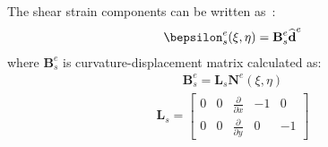 \documentclass[a4paper,12pt]{article}
\begin{document}
The shear strain components can be written as~\cite{ferreira2008matlab}:
\begin{eqnarray}
\bepsilon_s^e(\xi,\eta)=\textbf{B}_s^e\widehat{\textbf{d}}^e
\end{eqnarray}
where $\textbf{B}_s^e$ is curvature-displacement matrix calculated as:
\begin{eqnarray}
\textbf{B}_s^e=\textbf{L}_s\textbf{N}^e(\xi,\eta)
\end{eqnarray}
\begin{eqnarray}
\textbf{L}_s=\left [
\begin{array}{ccccc}
0 & 0 & \frac{\partial }{\partial x} & -1 & 0 \\
0 & 0 & \frac{\partial }{\partial y} & 0 & -1
\end{array} \right]
\end{eqnarray}
\end{document}
